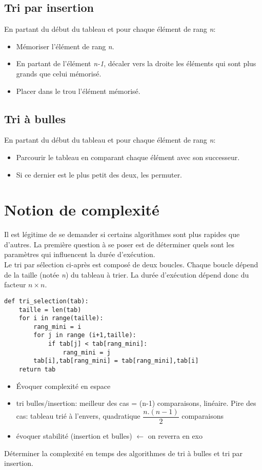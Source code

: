 \documentclass[a4paper,11pt]{article}
\begin{document}
\begin{Form}
\subsection{Tri par insertion}
En partant du début du tableau et pour chaque élément de rang \emph{n}:
\begin{itemize}
\item Mémoriser l'élément de rang \emph{n}.
\item En partant de l'élément \emph{n-1}, décaler vers la droite les éléments qui sont plus grands que celui mémorisé.
\item Placer dans le trou l'élément mémorisé.
\end{itemize}
\subsection{Tri à bulles}
En partant du début du tableau et pour chaque élément de rang \emph{n}:
\begin{itemize}
\item Parcourir le tableau en comparant chaque élément avec son successeur.
\item Si ce dernier est le plus petit des deux, les permuter.
\end{itemize}
\pagebreak
\section{Notion de complexité}
\label{complexite}
Il est légitime de se demander si certains algorithmes sont plus rapides que d'autres. La première question à se poser est de déterminer quels sont les paramètres qui influencent la durée d'exécution.\\
Le tri par sélection ci-après est composé de deux boucles. Chaque boucle dépend de la taille (notée \emph{n}) du tableau à trier. La durée d'exécution dépend donc du facteur $n×n$.
\begin{center}
\end{center}
\begin{lstlisting}
def tri_selection(tab):
    taille = len(tab)
    for i in range(taille):
        rang_mini = i
        for j in range (i+1,taille):
            if tab[j] < tab[rang_mini]:
                rang_mini = j
        tab[i],tab[rang_mini] = tab[rang_mini],tab[i]
    return tab
\end{lstlisting}
\begin{commentprof}
\begin{itemize}
\item Évoquer complexité en espace
\item tri bulles/insertion: meilleur des cas = (n-1) comparaisons, linéaire. Pire des cas: tableau trié à l'envers, quadratique $\dfrac{n.(n-1)}{2}$ comparaisons
\item évoquer stabilité (insertion et bulles) $\leftarrow$ on reverra en exo
\end{itemize}
\end{commentprof}
\begin{activite}
Déterminer la complexité en temps des algorithmes de tri à bulles et tri par insertion.
\end{activite}

\end{Form}
\end{document}
